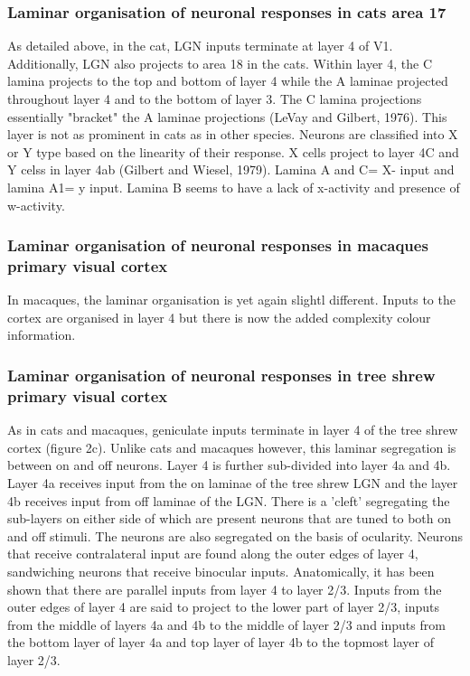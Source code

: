 			\subsubsection{Laminar organisation of neuronal responses in cats area 17}
				 As detailed above, in the cat, LGN inputs terminate at layer 4 of V1. Additionally, LGN also projects to area 18 in the cats. Within layer 4, the C lamina projects to the top and bottom of layer 4 while the A laminae projected throughout layer 4 and to the bottom of layer 3. The C lamina projections essentially "bracket" the A laminae projections (LeVay and Gilbert, 1976). This layer is not as prominent in cats as in other species. Neurons are classified into X or Y type based on the linearity of their response. X cells project to layer 4C and Y celss in layer 4ab (Gilbert and Wiesel, 1979). Lamina A and C= X- input and lamina A1= y input. Lamina B seems to have a lack of x-activity and presence of w-activity.
			 \subsubsection{Laminar organisation of neuronal responses in macaques primary visual cortex}
	 
				 In macaques, the laminar organisation is yet again slightl different. Inputs to the cortex are organised in layer 4 but there is now the added complexity colour information. 
	 
	 
			 \subsubsection{Laminar organisation of neuronal responses in tree shrew primary visual cortex}
	 
				As in cats and macaques, geniculate inputs terminate in layer 4 of the tree shrew cortex (figure 2c). Unlike cats and macaques however, this laminar segregation is between on and off neurons. Layer 4 is further sub-divided into layer 4a and 4b. Layer 4a receives input from the on laminae of the tree shrew LGN and the layer 4b receives input from off laminae of the LGN. There is a 'cleft' segregating the sub-layers on either side of which are present neurons that are tuned to both on and off stimuli. The neurons are also segregated on the basis of ocularity. Neurons that receive contralateral input are found along the outer edges of layer 4, sandwiching neurons that receive binocular inputs. Anatomically, it has been shown that there are parallel inputs from layer 4 to layer 2/3. Inputs from the outer edges of layer 4 are said to project to the lower part of layer 2/3, inputs from the middle of layers 4a and 4b to the middle of layer 2/3 and inputs from the bottom layer of layer 4a and top layer of layer 4b to the topmost layer of layer 2/3. 
	
